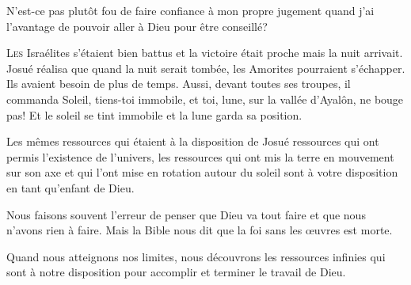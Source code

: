 N'est-ce pas plutôt fou de faire confiance à mon propre jugement
 quand j'ai l'avantage de pouvoir aller à Dieu pour être conseillé? 

\dvrule







\lettrine{L}{es} Israélites s'étaient bien battus
 et la victoire était proche \ocadr mais la nuit arrivait.
 Josué réalisa que quand la nuit serait tombée,
 les Amorites pourraient s'échapper. Ils avaient besoin de plus de temps.
 Aussi, devant toutes ses troupes, il commanda\frcolon{}
 \Og Soleil, tiens-toi immobile, et toi, lune, sur la vallée d'Ayalôn,
 ne bouge pas! \Fg{}
 Et le soleil se tint immobile et la lune garda sa position.

Les mêmes ressources qui étaient à la disposition de Josué
 \ocadr ressources qui ont permis l'existence de l'univers,
 les ressources qui ont mis la terre en mouvement sur son axe
 et qui l'ont mise en rotation autour du soleil \fcadr{}
 sont à votre disposition en tant qu'enfant de Dieu.

Nous faisons souvent l'erreur de penser que Dieu va tout faire
 et que nous n'avons rien à faire.
 Mais la Bible nous dit que la foi sans les \oe{}uvres est morte.



Quand nous atteignons nos limites, nous découvrons les ressources infinies
 qui sont à notre disposition pour accomplir et terminer le travail de Dieu.

\dvrule


